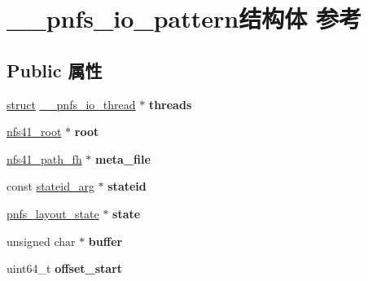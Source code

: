 \hypertarget{struct____pnfs__io__pattern}{}\section{\+\_\+\+\_\+pnfs\+\_\+io\+\_\+pattern结构体 参考}
\label{struct____pnfs__io__pattern}
\subsection*{Public 属性}
\begin{DoxyCompactItemize}
\item 
\mbox{\label{struct____pnfs__io__pattern_abf8436ea05714639d6ca433c07bb5041}} 
\hyperlink{interfacestruct}{struct} \hyperlink{struct____pnfs__io__thread}{\+\_\+\+\_\+pnfs\+\_\+io\+\_\+thread} $\ast$ {\bfseries threads}
\item 
\mbox{\label{struct____pnfs__io__pattern_a572bc0db8b523d81b91acf16a28b9339}} 
\hyperlink{struct____nfs41__root}{nfs41\+\_\+root} $\ast$ {\bfseries root}
\item 
\mbox{\label{struct____pnfs__io__pattern_a36de51974bc699eb251d9b85b6476b13}} 
\hyperlink{struct____nfs41__path__fh}{nfs41\+\_\+path\+\_\+fh} $\ast$ {\bfseries meta\+\_\+file}
\item 
\mbox{\label{struct____pnfs__io__pattern_a121aed0babaac03f88195f4bf1c6182b}} 
const \hyperlink{struct____stateid__arg}{stateid\+\_\+arg} $\ast$ {\bfseries stateid}
\item 
\mbox{\label{struct____pnfs__io__pattern_a7405fca7bc5687868b83b0860d738cd5}} 
\hyperlink{struct____pnfs__layout__state}{pnfs\+\_\+layout\+\_\+state} $\ast$ {\bfseries state}
\item 
\mbox{\label{struct____pnfs__io__pattern_ab20a1d022bff9cdb8075dc1d29f724e8}} 
unsigned char $\ast$ {\bfseries buffer}
\item 
\mbox{\label{struct____pnfs__io__pattern_a3011b1dd8c97a33eba59321b77cf6fa8}} 
uint64\+\_\+t {\bfseries offset\+\_\+start}

\end{DoxyCompactItemize}
